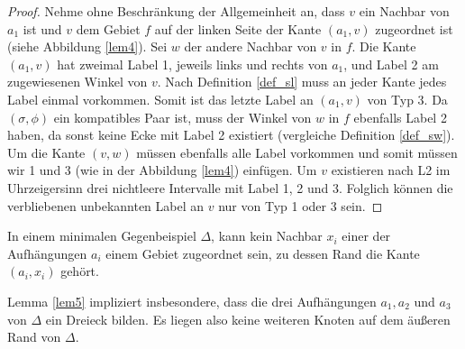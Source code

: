 \begin{proof}
Nehme ohne Beschränkung der Allgemeinheit an, dass $v$ ein Nachbar von $a_1$ ist und $v$ dem Gebiet $f$ auf der linken Seite der Kante $(a_1,v)$ zugeordnet ist (siehe Abbildung \ref{lem4}). Sei $w$ der andere Nachbar von $v$ in $f$. Die Kante $(a_1,v)$ hat zweimal Label 1, jeweils links und rechts von $a_1$, und Label 2 am zugewiesenen Winkel von $v$. Nach Definition \ref{def_sl} muss an jeder Kante jedes Label einmal vorkommen. Somit ist das letzte Label an $(a_1,v)$ von Typ 3. Da $(\sigma,\phi)$ ein kompatibles Paar ist, muss der Winkel von $w$ in $f$ ebenfalls Label 2 haben, da sonst keine Ecke mit Label 2 existiert (vergleiche Definition \ref{def_sw}). Um die Kante $(v,w)$ müssen ebenfalls alle Label vorkommen und somit müssen wir 1 und 3 (wie in der Abbildung \ref{lem4}) einfügen. Um $v$ existieren nach L2 im Uhrzeigersinn drei nichtleere Intervalle mit Label 1, 2 und 3. Folglich können die verbliebenen unbekannten Label an $v$ nur von Typ 1 oder 3 sein.
\end{proof}

\begin{lemma}\label{lem5}
In einem minimalen Gegenbeispiel $\Delta$, kann kein Nachbar $x_i$ einer der Aufhängungen $a_i$ einem Gebiet zugeordnet sein, zu dessen Rand die Kante $(a_i,x_i)$ gehört.
\end{lemma}

\begin{remark}
Lemma \ref{lem5} impliziert insbesondere, dass die drei Aufhängungen $a_1,a_2$ und $a_3$ von $\Delta$ ein Dreieck bilden. Es liegen also keine weiteren Knoten auf dem äußeren Rand von $\Delta$.
\end{remark}

